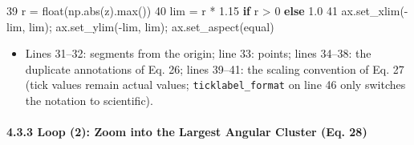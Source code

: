 \documentclass[
  a4paper,
]{ltjsarticle}
\newenvironment{Shaded}{}{}
\newcommand{\BuiltInTok}[1]{\textcolor[rgb]{0.00,0.50,0.00}{#1}}
\newcommand{\ControlFlowTok}[1]{\textcolor[rgb]{0.00,0.44,0.13}{\textbf{#1}}}
\newcommand{\DecValTok}[1]{\textcolor[rgb]{0.25,0.63,0.44}{#1}}
\newcommand{\FloatTok}[1]{\textcolor[rgb]{0.25,0.63,0.44}{#1}}
\newcommand{\NormalTok}[1]{#1}
\newcommand{\OperatorTok}[1]{\textcolor[rgb]{0.40,0.40,0.40}{#1}}
\newcommand{\StringTok}[1]{\textcolor[rgb]{0.25,0.44,0.63}{#1}}
\providecommand{\tightlist}{%
  \setlength{\itemsep}{0pt}\setlength{\parskip}{0pt}}
\begin{document}
\begin{Shaded}
\begin{Highlighting}[]
    \DecValTok{39}\NormalTok{          r }\OperatorTok{=} \BuiltInTok{float}\NormalTok{(np.}\BuiltInTok{abs}\NormalTok{(z).}\BuiltInTok{max}\NormalTok{())}
    \DecValTok{40}\NormalTok{          lim }\OperatorTok{=}\NormalTok{ r }\OperatorTok{*} \FloatTok{1.15} \ControlFlowTok{if}\NormalTok{ r }\OperatorTok{\textgreater{}} \DecValTok{0} \ControlFlowTok{else} \FloatTok{1.0}
    \DecValTok{41}\NormalTok{          ax.set\_xlim(}\OperatorTok{{-}}\NormalTok{lim, lim)}\OperatorTok{;}\NormalTok{ ax.set\_ylim(}\OperatorTok{{-}}\NormalTok{lim, lim)}\OperatorTok{;}\NormalTok{ ax.set\_aspect(}\StringTok{\textquotesingle{}equal\textquotesingle{}}\NormalTok{)}
\end{Highlighting}
\end{Shaded}

\begin{itemize}
\tightlist
\item
  Lines 31--32: segments from the origin; line 33: points; lines 34--38:
  the duplicate annotations of Eq. 26; lines 39--41: the scaling
  convention of Eq. 27 (tick values remain actual values;
  \texttt{ticklabel\_format} on line 46 only switches the notation to
  scientific).
\end{itemize}

\paragraph{4.3.3 Loop (2): Zoom into the Largest Angular Cluster (Eq.
28)}\label{loop-2-zoom-into-the-largest-angular-cluster-eq.-28}
\end{document}
